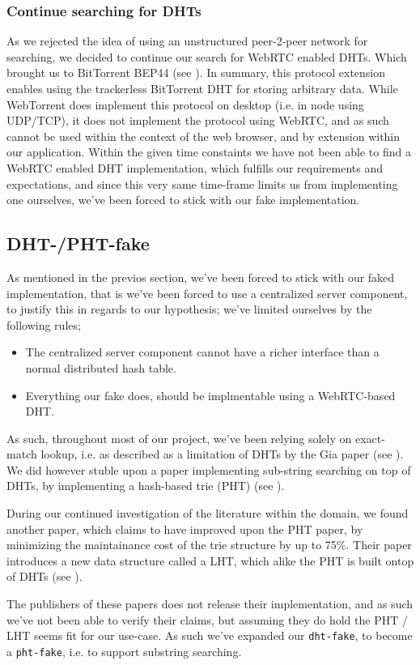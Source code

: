 \subsubsection{Continue searching for \acs{DHT}s}
As we rejected the idea of using an unstructured peer-2-peer network for
searching, we decided to continue our search for WebRTC enabled \acs{DHT}s. Which
brought us to BitTorrent \acs{BEP}44 (see \citep{bittorrent:bep44}). In summary, this
protocol extension enables using the trackerless BitTorrent \acs{DHT} for storing
arbitrary data. While WebTorrent does implement this protocol on desktop (i.e.
in node using \acs{UDP}/\acs{TCP}), it does not implement the protocol using WebRTC, and as
such cannot be used within the context of the web browser, and by extension
within our application.
\newline\newline
Within the given time constaints we have not been able to find a WebRTC enabled
\acs{DHT} implementation, which fulfills our requirements and expectations, and since
this very same time-frame limits us from implementing one ourselves, we've been
forced to stick with our fake implementation.

\subsection{\acs{DHT}-/\acs{PHT}-fake}
As mentioned in the previos section, we've been forced to stick with our faked
implementation, that is we've been forced to use a centralized server component,
to justify this in regards to our hypothesis; we've limited ourselves by the 
following rules;
\begin{itemize}
\item The centralized server component cannot have a richer interface than a 
    normal distributed hash table.
\item Everything our fake does, should be implmentable using a WebRTC-based \acs{DHT}.
\end{itemize}
As such, throughout most of our project, we've been relying solely on
exact-match lookup, i.e. as described as a limitation of \acs{DHT}s by the Gia paper
(see \citep{Chawathe:Gia}). We did however stuble upon a paper implementing 
sub-string searching on top of \acs{DHT}s, by implementing a hash-based trie (\acs{PHT})
(see \citep{Ramabhadran:PHT}).

During our continued investigation of the literature within the domain, we 
found another paper, which claims to have improved upon the \acs{PHT} paper, by 
minimizing the maintainance cost of the trie structure by up to 75\%. Their
paper introduces a new data structure called a \ac{LHT},
which alike the \acs{PHT} is built ontop of \acs{DHT}s (see \citep{Tang:LHT}).

The publishers of these papers does not release their implementation, and as
such we've not been able to verify their claims, but assuming they do hold the
\acs{PHT} / \acs{LHT} seems fit for our use-case. As such we've expanded our \verb|dht-fake|,
to become a \verb|pht-fake|, i.e. to support substring searching.
